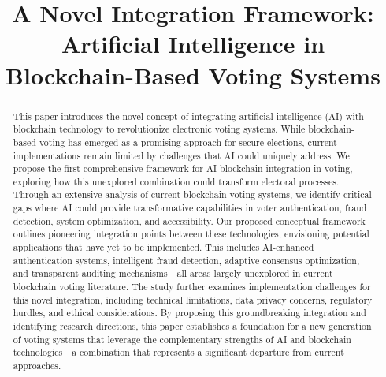 \documentclass[conference]{IEEEtran}
\begin{document}
\title{A Novel Integration Framework: Artificial Intelligence in Blockchain-Based Voting Systems\\}

\author{
    \and
    \and
}

\maketitle

\begin{abstract}
This paper introduces the novel concept of integrating artificial intelligence (AI) with blockchain technology to revolutionize electronic voting systems. While blockchain-based voting has emerged as a promising approach for secure elections, current implementations remain limited by challenges that AI could uniquely address. We propose the first comprehensive framework for AI-blockchain integration in voting, exploring how this unexplored combination could transform electoral processes. Through an extensive analysis of current blockchain voting systems, we identify critical gaps where AI could provide transformative capabilities in voter authentication, fraud detection, system optimization, and accessibility. Our proposed conceptual framework outlines pioneering integration points between these technologies, envisioning potential applications that have yet to be implemented. This includes AI-enhanced authentication systems, intelligent fraud detection, adaptive consensus optimization, and transparent auditing mechanisms—all areas largely unexplored in current blockchain voting literature. The study further examines implementation challenges for this novel integration, including technical limitations, data privacy concerns, regulatory hurdles, and ethical considerations. By proposing this groundbreaking integration and identifying research directions, this paper establishes a foundation for a new generation of voting systems that leverage the complementary strengths of AI and blockchain technologies—a combination that represents a significant departure from current approaches.
\end{abstract}
\end{document}
